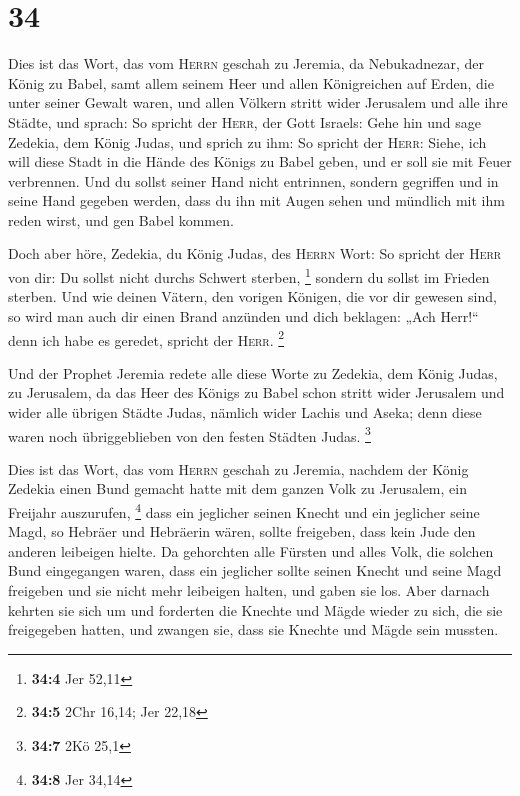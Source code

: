 \hypertarget{section-8}{%
\section{34}\label{section-8}}

 Dies ist das Wort, das vom \textsc{Herrn} geschah zu
Jeremia, da Nebukadnezar, der König zu Babel, samt allem seinem Heer und
allen Königreichen auf Erden, die unter seiner Gewalt waren, und allen
Völkern stritt wider Jerusalem und alle ihre Städte, und sprach:
 So spricht der \textsc{Herr}, der Gott Israels: Gehe hin
und sage Zedekia, dem König Judas, und sprich zu ihm: So spricht der
\textsc{Herr}: Siehe, ich will diese Stadt in die Hände des Königs zu
Babel geben, und er soll sie mit Feuer verbrennen.  Und du
sollst seiner Hand nicht entrinnen, sondern gegriffen und in seine Hand
gegeben werden, dass du ihn mit Augen sehen und mündlich mit ihm reden
wirst, und gen Babel kommen.

 Doch aber höre, Zedekia, du König Judas, des
\textsc{Herrn} Wort: So spricht der \textsc{Herr} von dir: Du sollst
nicht durchs Schwert sterben, \footnote{\textbf{34:4} Jer 52,11}
 sondern du sollst im Frieden sterben. Und wie deinen
Vätern, den vorigen Königen, die vor dir gewesen sind, so wird man auch
dir einen Brand anzünden und dich beklagen: „Ach Herr!{}`` denn ich habe
es geredet, spricht der \textsc{Herr}. \footnote{\textbf{34:5} 2Chr
  16,14; Jer 22,18}

 Und der Prophet Jeremia redete alle diese Worte zu
Zedekia, dem König Judas, zu Jerusalem,  da das Heer des
Königs zu Babel schon stritt wider Jerusalem und wider alle übrigen
Städte Judas, nämlich wider Lachis und Aseka; denn diese waren noch
übriggeblieben von den festen Städten Judas. \footnote{\textbf{34:7} 2Kö
  25,1}

 Dies ist das Wort, das vom \textsc{Herrn} geschah zu
Jeremia, nachdem der König Zedekia einen Bund gemacht hatte mit dem
ganzen Volk zu Jerusalem, ein Freijahr auszurufen, \footnote{\textbf{34:8}
  Jer 34,14}  dass ein jeglicher seinen Knecht und ein
jeglicher seine Magd, so Hebräer und Hebräerin wären, sollte freigeben,
dass kein Jude den anderen leibeigen hielte.  Da
gehorchten alle Fürsten und alles Volk, die solchen Bund eingegangen
waren, dass ein jeglicher sollte seinen Knecht und seine Magd freigeben
und sie nicht mehr leibeigen halten, und gaben sie los. 
Aber darnach kehrten sie sich um und forderten die Knechte und Mägde
wieder zu sich, die sie freigegeben hatten, und zwangen sie, dass sie
Knechte und Mägde sein mussten.

